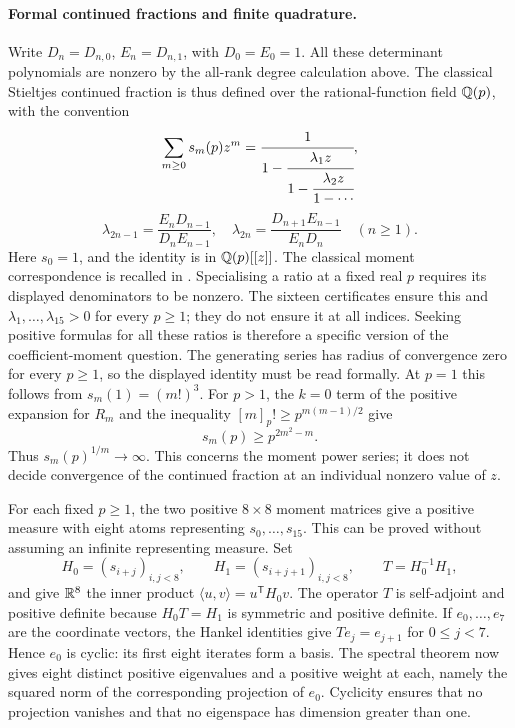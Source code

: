 \documentclass[11pt]{article}
\begin{document}
\paragraph{Formal continued fractions and finite quadrature.}
Write $D_n=D_{n,0}$, $E_n=D_{n,1}$, with $D_0=E_0=1$.
All these determinant polynomials are nonzero by the all-rank degree
calculation above. The classical Stieltjes continued fraction is thus
defined over the rational-function field $\mathbb{Q}(p)$, with the convention
\[
 \sum_{m\ge0}s_m(p)z^m
 =\cfrac{1}{1-\cfrac{\lambda_1z}{1-\cfrac{\lambda_2z}{1-\cdots}}},
\]
\[
 \lambda_{2n-1}=\frac{E_nD_{n-1}}{D_nE_{n-1}},\quad
 \lambda_{2n}=\frac{D_{n+1}E_{n-1}}{E_nD_n}\quad(n\ge1).
\]
Here $s_0=1$, and the identity is in $\mathbb{Q}(p)[[z]]$. The classical
moment correspondence is recalled in \cite[pp.~1--2]{sw2024}.
Specialising a ratio at a fixed real $p$ requires its displayed
denominators to be nonzero. The sixteen certificates ensure this and
$\lambda_1,\ldots,\lambda_{15}>0$ for every $p\ge1$; they do not ensure
it at all indices. Seeking positive formulas for all these ratios is
therefore a specific version of the coefficient-moment question.
The generating series has radius of convergence zero for every
$p\ge1$, so the displayed identity must be read formally. At $p=1$
this follows from $s_m(1)=(m!)^3$. For $p>1$, the $k=0$ term of the
positive expansion for $R_m$ and the inequality
$[m]_p!\ge p^{m(m-1)/2}$ give
\[
 s_m(p)\ge p^{2m^2-m}.
\]
Thus $s_m(p)^{1/m}\to\infty$. This concerns the moment power series;
it does not decide convergence of the continued fraction at an
individual nonzero value of $z$.

For each fixed $p\ge1$, the two positive $8\times8$ moment matrices give
a positive measure with eight atoms representing $s_0,\ldots,s_{15}$. This can be proved
without assuming an infinite representing measure. Set
\[
 H_0=(s_{i+j})_{i,j<8},\qquad H_1=(s_{i+j+1})_{i,j<8},\qquad
 T=H_0^{-1}H_1,
\]
and give $\mathbb{R}^8$ the inner product
$\langle u,v\rangle=u^{\mathsf T}H_0v$.
The operator $T$ is self-adjoint and positive definite because
$H_0T=H_1$ is symmetric and positive definite. If $e_0,\ldots,e_7$
are the coordinate vectors, the Hankel identities give
$Te_j=e_{j+1}$ for $0\le j<7$. Hence $e_0$ is cyclic: its first
eight iterates form a basis. The spectral theorem now gives eight
distinct positive eigenvalues and a positive weight at each, namely
the squared norm of the corresponding projection of $e_0$.
Cyclicity ensures that no projection vanishes and that no eigenspace
has dimension greater than one.
\end{document}
